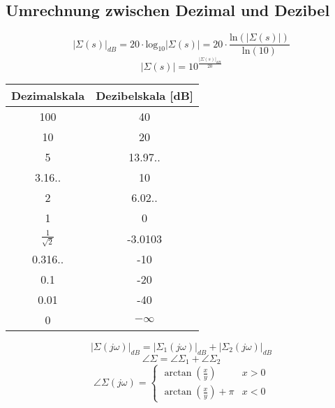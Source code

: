 \subsection{Umrechnung zwischen Dezimal und Dezibel}
    \begin{equation*}
        |\Sigma(s)|_{dB} = 20 \cdot \textrm{log}_{10}|\Sigma(s)| =             20\cdot\frac{\textrm{ln}(|\Sigma(s)|)}{\textrm{ln}(10)}
    \end{equation*}
    \begin{equation*}
        |\Sigma(s)| = 10^{\frac{|\Sigma(s)|_{dB}}{20}}
    \end{equation*}
    \begin{center}
    {\renewcommand{\arraystretch}{1.4}
        \begin{tabular}{c|c}
        Dezimalskala    &   Dezibelskala [dB]\\
        \hline
        100 &   40  \\
        10  &   20  \\
        5   &   13.97..\\
        3.16.. & 10\\
        2   &   6.02..\\
        1   &   0   \\
        $\frac{1}{\sqrt{2}}$  &   -3.0103\\
        0.316.. & -10\\
        0.1 &   -20 \\
        0.01    &   -40\\
        0       &   $-\infty$
        \end{tabular}}
    \end{center}
    \begin{equation*}
        |\Sigma(j\omega)|_{dB} = |\Sigma_1(j\omega)|_{dB}+|\Sigma_2(j\omega)|_{dB}
    \end{equation*}
    \begin{equation*}
        \angle\Sigma= \angle\Sigma_{1}+ \angle\Sigma_{2}
    \end{equation*}
    \begin{equation*}
        \angle\Sigma(j\omega)=
        \begin{cases}
            \arctan(\frac{x}{y}) & x > 0\\
            \arctan(\frac{x}{y})+\pi & x<0
        \end{cases}
    \end{equation*}
    
